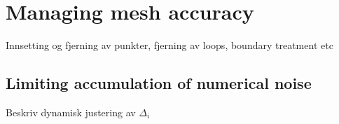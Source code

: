 \section{Managing mesh accuracy}
\label{sec:managing_mesh_accuracy}

\begin{framed}
    Innsetting og fjerning av punkter, fjerning av loops, boundary treatment etc
\end{framed}

\subsection{Limiting accumulation of numerical noise}
\label{sub:limiting_accumulation_of_numerical_noise}

\begin{framed}
    Beskriv dynamisk justering av $\Delta_{i}$
\end{framed}

